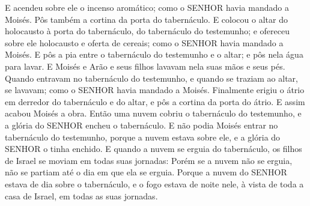 {E acendeu sobre ele o incenso aromático; como o SENHOR havia mandado a Moisés.
Pôs também a cortina da porta do tabernáculo.
E colocou o altar do holocausto à porta do tabernáculo, do tabernáculo do testemunho; e ofereceu sobre ele holocausto e oferta de cereais; como o SENHOR havia mandado a Moisés.
E pôs a pia entre o tabernáculo do testemunho e o altar; e pôs nela água para lavar.
E Moisés e Arão e seus filhos lavavam nela suas mãos e seus pés.
Quando entravam no tabernáculo do testemunho, e quando se traziam ao altar, se lavavam; como o SENHOR havia mandado a Moisés.
Finalmente erigiu o átrio em derredor do tabernáculo e do altar, e pôs a cortina da porta do átrio. E assim acabou Moisés a obra.
Então uma nuvem cobriu o tabernáculo do testemunho, e a glória do SENHOR encheu o tabernáculo.
E não podia Moisés entrar no tabernáculo do testemunho, porque a nuvem estava sobre ele, e a glória do SENHOR o tinha enchido.
E quando a nuvem se erguia do tabernáculo, os filhos de Israel se moviam em todas suas jornadas:
Porém se a nuvem não se erguia, não se partiam até o dia em que ela se erguia.
Porque a nuvem do SENHOR estava de dia sobre o tabernáculo, e o fogo estava de noite nele, à vista de toda a casa de Israel, em todas as suas jornadas.\par }